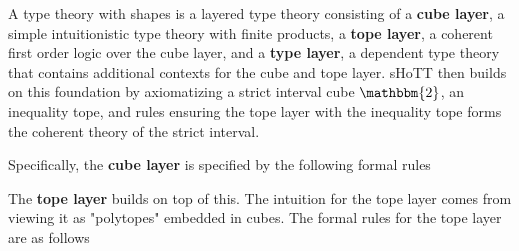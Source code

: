 \documentclass[main.tex]{subfiles}
\begin{document}
A type theory with shapes is a layered type theory consisting of a \textbf{cube layer}, a simple intuitionistic type theory with finite products,
a \textbf{tope layer}, a coherent first order logic over the cube layer, and a \textbf{type layer}, a dependent type theory that contains additional
contexts for the cube and tope layer. sHoTT then builds on this foundation by axiomatizing a strict interval cube $\mathbbm{2}$, an inequality tope,
and rules ensuring the tope layer with the inequality tope forms the coherent theory of the strict interval.

Specifically, the \textbf{cube layer} is specified by the following formal rules
The \textbf{tope layer} builds on top of this. The intuition for the tope layer comes from viewing it as "polytopes" embedded in cubes.
The formal rules for the tope layer are as follows
\end{document}
